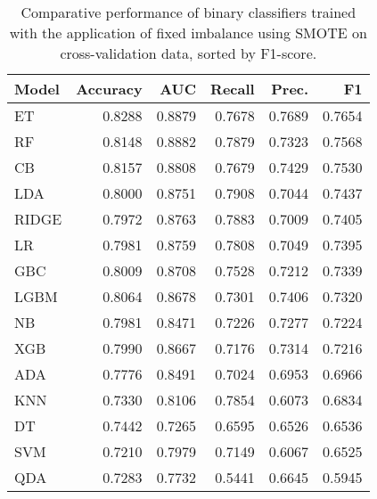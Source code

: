 \begin{table}
\caption{Comparative performance of binary classifiers trained with the application of fixed imbalance using SMOTE on cross-validation data, sorted by F1-score.}
\label{tbl:binary_True_SMOTE_cv_res_compare_models_df}
\begin{tabular}{lrrrrr}
\toprule
Model & Accuracy & AUC & Recall & Prec. & F1 \\
\midrule
ET & 0.8288 & 0.8879 & 0.7678 & 0.7689 & 0.7654 \\
RF & 0.8148 & 0.8882 & 0.7879 & 0.7323 & 0.7568 \\
CB & 0.8157 & 0.8808 & 0.7679 & 0.7429 & 0.7530 \\
LDA & 0.8000 & 0.8751 & 0.7908 & 0.7044 & 0.7437 \\
RIDGE & 0.7972 & 0.8763 & 0.7883 & 0.7009 & 0.7405 \\
LR & 0.7981 & 0.8759 & 0.7808 & 0.7049 & 0.7395 \\
GBC & 0.8009 & 0.8708 & 0.7528 & 0.7212 & 0.7339 \\
LGBM & 0.8064 & 0.8678 & 0.7301 & 0.7406 & 0.7320 \\
NB & 0.7981 & 0.8471 & 0.7226 & 0.7277 & 0.7224 \\
XGB & 0.7990 & 0.8667 & 0.7176 & 0.7314 & 0.7216 \\
ADA & 0.7776 & 0.8491 & 0.7024 & 0.6953 & 0.6966 \\
KNN & 0.7330 & 0.8106 & 0.7854 & 0.6073 & 0.6834 \\
DT & 0.7442 & 0.7265 & 0.6595 & 0.6526 & 0.6536 \\
SVM & 0.7210 & 0.7979 & 0.7149 & 0.6067 & 0.6525 \\
QDA & 0.7283 & 0.7732 & 0.5441 & 0.6645 & 0.5945 \\
\bottomrule
\end{tabular}
\end{table}
